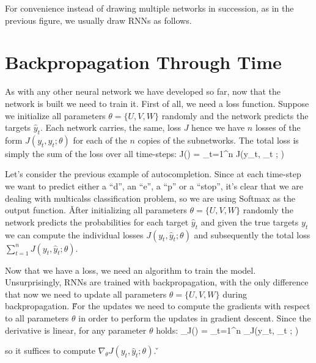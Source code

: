 For convenience instead of drawing multiple networks in succession, as in the previous figure, we usually draw RNNs as
follows.

\vspace{-5pt}



\section{Backpropagation Through Time}

As with any other neural network we have developed so far, now that the network is built we need to train it. First of
all, we need a loss function. Suppose we initialize all parameters $\theta = \{U, V, W\}$ randomly and the network
predicts the targets $\hat{y}_t$. Each network carries, the same, loss $J$ hence we have $n$ losses of the form
$J(y_t, \hat{y}_t ; \theta)$ for each of the $n$ copies of the subnetworks. The total loss is simply the sum of the
loss over all time-steps:
\bse
J(\theta) = \sum_{t=1}^{n} J(y_t, _t ; \theta)
\ese

\be
Let's consider the previous example of autocompletion. Since at each time-step we want to predict either a ``d'', an
``e'', a ``p'' or a ``stop'', it's clear that we are dealing with multicalss classification problem, so we are using
Softmax as the output function. \v

After initializing all parameters $\theta = \{U, V, W\}$ randomly the network predicts the probabilities for each
target $\hat{y}_t$ and given the true targets $y_t$ we can compute the individual losses $J(y_t, \hat{y}_t ; \theta)$
and subsequently the total loss $\sum_{t=1}^{n} J(y_t, \hat{y}_t ; \theta)$.

\ee

Now that we have a loss, we need an algorithm to train the model. Unsurprisingly, RNNs are trained with
backpropagation, with the only difference that now we need to update all parameters $\theta = \{U, V, W\}$ during
backpropagation. \v

For the updates we need to compute the gradients with respect to all parameters $\theta$ in order to perform the
updates in gradient descent. Since the derivative is linear, for any parameter $\theta$ holds:
\bse
\nabla_\theta J(\theta) = \sum_{t=1}^{n} \nabla_\theta J(y_t, _t ; \theta)
\ese

so it suffices to compute $\nabla_\theta J(y_t, \hat{y}_t ; \theta)$. \v

